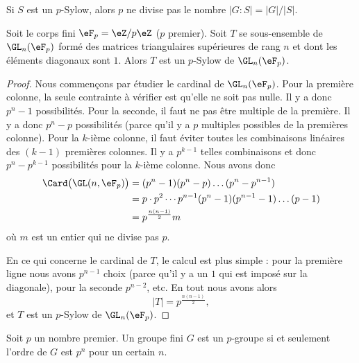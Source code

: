 Si \( S\) est un \( p\)-Sylow, alors \( p\) ne divise pas le nombre \( | G:S |=| G |/| S |\).

\begin{proposition}     \label{Propvocmon}
    Soit le corps fini \( \eF_p=\eZ/p\eZ\) (\( p\) premier). Soit \( T\) se sous-ensemble de \( \GL_n(\eF_p)\) formé des matrices triangulaires supérieures de rang \( n\) et dont les éléments diagonaux sont \( 1\). Alors \( T\) est un \( p\)-Sylow de \( \GL_n(\eF_p)\).
\end{proposition}

\begin{proof}
    Nous commençons par étudier le cardinal de \( \GL_n(\eF_p)\). Pour la première colonne, la seule contrainte à vérifier est qu'elle ne soit pas nulle. Il y a donc \( p^n-1\) possibilités. Pour la seconde, il faut ne pas être multiple de la première. Il y a donc \( p^n-p\) possibilités (parce qu'il y a \( p\) multiples possibles de la premières colonne). Pour la \( k\)-ième colonne, il faut éviter toutes les combinaisons linéaires des \( (k-1)\) premières colonnes. Il y a \( p^{k-1}\) telles combinaisons et donc \( p^n-p^{k-1}\) possibilités pour la \( k\)-ième colonne. Nous avons donc
    \begin{subequations}
        \begin{align}
            \Card\big( \GL(n,\eF_{p}) \big)&=(p^n-1)(p^n-p)\ldots(p^n-p^{n-1})\\
            &=p\cdot p^2\cdots p^{n-1}(p^n-1)(p^{n-1}-1)\ldots (p-1)\\
            &=p^{\frac{ n(n-1) }{2}}m
        \end{align}
    \end{subequations}
    où \( m\) est un entier qui ne divise pas \( p\).

    En ce qui concerne le cardinal de \( T\), le calcul est plus simple : pour la première ligne nous avons \( p^{n-1}\) choix (parce qu'il y a un \( 1\) qui est imposé sur la diagonale), pour la seconde \( p^{n-2}\), etc. En tout nous avons alors
    \begin{equation}
        | T |=p^{\frac{ n(n-1) }{2}},
    \end{equation}
    et \( T\) est un \( p\)-Sylow de \( \GL_n(\eF_p)\).
\end{proof}


\begin{proposition}
    Soit \( p\) un nombre premier. Un groupe fini \( G\) est un $p$-groupe si et seulement l'ordre de \( G\) est \( p^n\) pour un certain \( n\).
\end{proposition}

